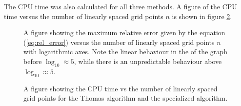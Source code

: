 \documentclass[twocolumn]{aastex62}
\begin{document}
The CPU time was also calculated for all three methods. A figure of the CPU time versus the number of linearly spaced grid points $n$ is shown in figure \ref{fig:CPUtimeplot}.

\begin{figure}[ht]
	\caption{A figure showing the maximum relative error given by the equation (\ref{eq:rel_error}) versus the number of linearly spaced grid points $n$ with logarithmic axes. Note the linear behaviour in the of the graph before $\log_{10} \approx 5$, while there is an unpredictable behaviour above $\log_{10} \approx 5$.} 
	\label{fig:specerror}
\end{figure}

\begin{figure}[ht]
	\caption{A figure showing the CPU time vs the number of linearly spaced grid points for the Thomas algorithm and the specialized algorithm. }	\label{fig:CPUtimeplot}
\end{figure}
\end{document}
